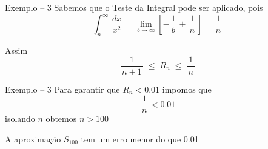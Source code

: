 \begin{frame}{Exemplo -- 3}
  Sabemos que o Teste da Integral pode ser aplicado, pois
  \[
    \int_n^\infty\frac{\,dx\,}{x^2}
    = \lim_{b\to\infty}\left[ -\frac{1}{\,b\,} + \frac{1}{\,n\,} \right]
    = \frac{1}{\,n\,}
  \]

  \pause
  \vspace{\baselineskip}
  Assim
  \[
    \frac{1}{\,n+1\,} \;\leq\; R_n \;\leq\; \frac{1}{\,n\,}
  \]
\end{frame}

\begin{frame}{Exemplo -- 3}
  Para garantir que $R_n<\num{0.01}$ impomos que
  \[
    \frac{1}{\,n\,} < \num{0.01}
  \]
  isolando $n$ obtemos $n>100$

  \pause
  \vspace{\baselineskip}
  A aproximação $S_{100}$ tem um erro menor do que \num{0.01}
\end{frame}

\begin{frame}{\contentsname}
  \tableofcontents
\end{frame}


